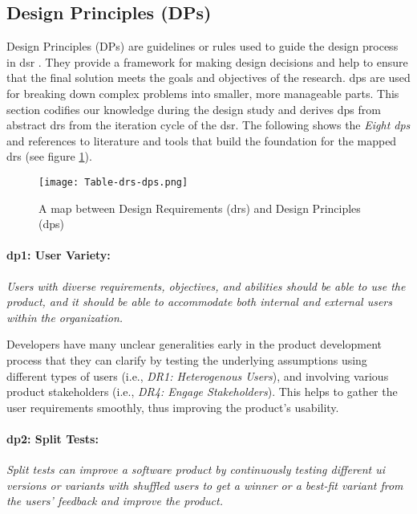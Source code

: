 \clearpage
\subsection{Design Principles (DPs)}
\label{design:section:designprinciple}
Design Principles (DPs) are guidelines or rules used to guide the design process in \ac{dsr} \cite{misc:dsr:henver}. 
They provide a framework for making design decisions \cite{paper:designprinciple:gregor} and help to ensure that the final solution meets the goals and objectives of the research. 
\ac{dp}s are used for breaking down complex problems into smaller, more manageable parts.
This section codifies our knowledge during the design study and derives \ac{dp}s from abstract \ac{dr}s from the iteration cycle of the \ac{dsr}.
The following shows the \textit{Eight \ac{dp}s} and references to literature and tools that build the foundation for the mapped \ac{dr}s (see figure \ref{fig:design:table-drs-dps}). 
\begin{figure}[htbp!]
  \centering    
  \texttt{[image: Table-drs-dps.png]}
  \caption[A map between \ac{dr}s and \ac{dp}s]{A map between Design Requirements (\ac{dr}s) and Design Principles (\ac{dp}s)}
  \label{fig:design:table-drs-dps}
\end{figure}

\paragraph{\ac{dp}1: User Variety:} \textit{Users with diverse requirements, objectives, and abilities should be able to use the product, and it should be able to accommodate both internal and external users within the organization.}

Developers have many unclear generalities early in the product development process \cite{misc:lean:steve} that they can clarify by testing the underlying assumptions using different types of users (i.e., \textit{DR1: Heterogenous Users}), and involving various product stakeholders (i.e., \textit{DR4: Engage Stakeholders}).
This helps to gather the user requirements smoothly, thus improving the product's usability.

\paragraph{\ac{dp}2: Split Tests:} \textit{Split tests can improve a software product by continuously testing different \ac{ui} versions or variants with shuffled users to get a winner or a best-fit variant from the users' feedback and improve the product.}

